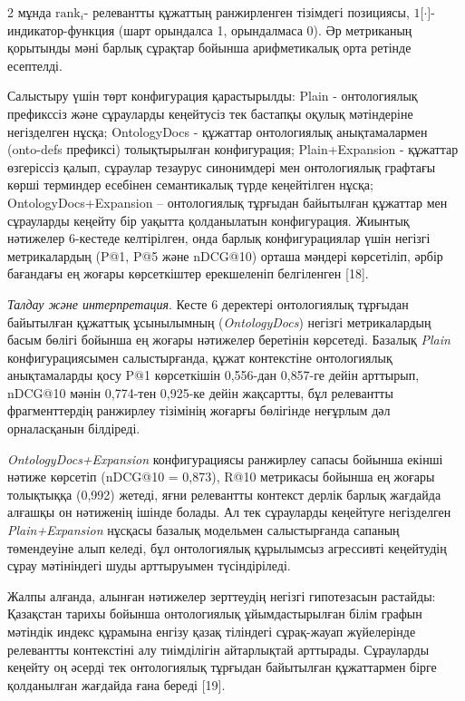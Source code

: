 \begin{multicols}{2}
мұнда \(\text{rank}_{i}\)- релевантты құжаттың ранжирленген тізімдегі
позициясы, \(1\lbrack \cdot \rbrack\)- индикатор-функция (шарт орындалса
1, орындалмаса 0). Әр метриканың қорытынды мәні барлық сұрақтар бойынша
арифметикалық орта ретінде есептелді.

Салыстыру үшін төрт конфигурация қарастырылды: Plain - онтологиялық
префикссіз және сұрауларды кеңейтусіз тек бастапқы оқулық мәтіндеріне
негізделген нұсқа; OntologyDocs - құжаттар онтологиялық анықтамалармен
(onto-defs префиксі) толықтырылған конфигурация; Plain+Expansion -
құжаттар өзгеріссіз қалып, сұраулар тезаурус синонимдері мен
онтологиялық графтағы көрші терминдер есебінен семантикалық түрде
кеңейтілген нұсқа; OntologyDocs+Expansion -- онтологиялық тұрғыдан
байытылған құжаттар мен сұрауларды кеңейту бір уақытта қолданылатын
конфигурация. Жиынтық нәтижелер 6-кестеде келтірілген, онда барлық
конфигурациялар үшін негізгі метрикалардың (P@1, P@5 және nDCG@10)
орташа мәндері көрсетіліп, әрбір бағандағы ең жоғары көрсеткіштер
ерекшеленіп белгіленген {[}18{]}.

\emph{Талдау және интерпретация}. Кесте 6 деректері
онтологиялық тұрғыдан байытылған құжаттық ұсынылымның
(\emph{OntologyDocs}) негізгі метрикалардың басым бөлігі бойынша ең
жоғары нәтижелер беретінін көрсетеді. Базалық \emph{Plain}
конфигурациясымен салыстырғанда, құжат контекстіне онтологиялық
анықтамаларды қосу P@1 көрсеткішін 0,556-дан 0,857-ге дейін арттырып,
nDCG@10 мәнін 0,774-тен 0,925-ке дейін жақсартты, бұл релевантты
фрагменттердің ранжирлеу тізімінің жоғарғы бөлігінде неғұрлым дәл
орналасқанын білдіреді.

\emph{OntologyDocs+Expansion} конфигурациясы ранжирлеу сапасы бойынша
екінші нәтиже көрсетіп (nDCG@10 = 0,873), R@10 метрикасы бойынша ең
жоғары толықтыққа (0,992) жетеді, яғни релевантты контекст дерлік барлық
жағдайда алғашқы он нәтиженің ішінде болады. Ал тек сұрауларды кеңейтуге
негізделген \emph{Plain+Expansion} нұсқасы базалық модельмен
салыстырғанда сапаның төмендеуіне алып келеді, бұл онтологиялық
құрылымсыз агрессивті кеңейтудің сұрау мәтініндегі шуды арттыруымен
түсіндіріледі.

Жалпы алғанда, алынған нәтижелер зерттеудің негізгі гипотезасын
растайды: Қазақстан тарихы бойынша онтологиялық ұйымдастырылған білім
графын мәтіндік индекс құрамына енгізу қазақ тіліндегі сұрақ-жауап
жүйелерінде релевантты контекстіні алу тиімділігін айтарлықтай
арттырады. Сұрауларды кеңейту оң әсерді тек онтологиялық тұрғыдан
байытылған құжаттармен бірге қолданылған жағдайда ғана береді {[}19{]}.
\end{multicols}

